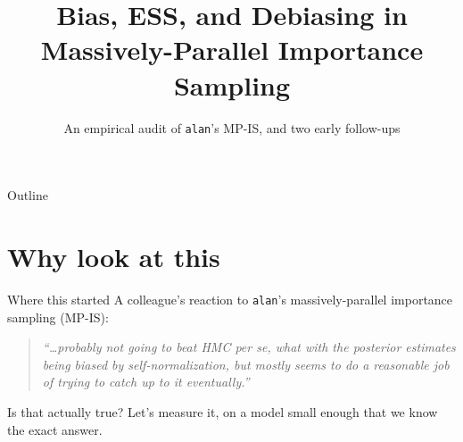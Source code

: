 \documentclass[aspectratio=169]{beamer}
\title{Bias, ESS, and Debiasing in Massively-Parallel Importance Sampling}
\subtitle{An empirical audit of \texttt{alan}'s MP-IS, and two early follow-ups}
\author{}
\date{}
\begin{document}
\maketitle

\begin{frame}{Outline}
  \tableofcontents
\end{frame}

\section{Why look at this}

\begin{frame}{Where this started}
  A colleague's reaction to \texttt{alan}'s massively-parallel importance
  sampling (MP-IS):
  \begin{quote}
    \itshape ``\dots probably not going to beat HMC per se, what with the
    posterior estimates being biased by self-normalization, but mostly seems
    to do a reasonable job of trying to catch up to it eventually.''
  \end{quote}
  \vfill
  \begin{center}
    \alert{Is that actually true?} Let's measure it, on a model small enough
    that we know the exact answer.
  \end{center}
\end{frame}
\end{document}
